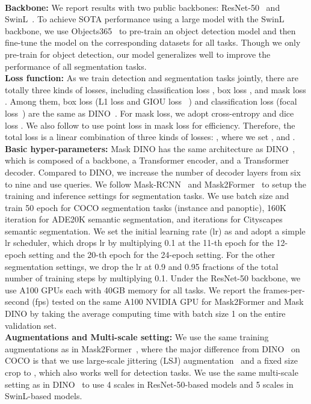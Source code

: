\documentclass[10pt,twocolumn,letterpaper]{article}
\begin{document}
\\\textbf{Backbone: }We report results with two public backbones: ResNet-50~\cite{he2015deep} and SwinL~\cite{liu2021swin}. To achieve SOTA performance using a large model with the SwinL backbone, we use Objects365~\cite{shao2019objects365} to pre-train an object detection model and then fine-tune the model on the corresponding datasets for all tasks. Though we only pre-train for object detection, our model generalizes well to improve the performance of all segmentation tasks.
\\\textbf{Loss function: }As we train detection and segmentation tasks jointly, there are totally three kinds of losses, including classification loss , box loss , and mask loss . Among them, box loss (L1 loss  and GIOU loss~\cite{rezatofighi2019generalized} ) and classification loss (focal loss~\cite{lin2018focal}) are the same as DINO~\cite{zhang2022dino}. For mask loss, we adopt cross-entropy  and dice loss . We also follow \cite{kirillov2020pointrend,cheng2021pointly,cheng2021mask2former} to use point loss in mask loss for efficiency. Therefore, the total loss is a linear combination of three kinds of losses: , where we set , and .
\\\textbf{Basic hyper-parameters: }Mask DINO has the same architecture as DINO~\cite{zhang2022dino}, which is composed of a backbone, a Transformer encoder, and a Transformer decoder. Compared to DINO, we increase the number of decoder layers from six to nine and use  queries. We follow Mask-RCNN~\cite{he2017mask} and Mask2Former~\cite{cheng2021mask2former} to setup the training and inference settings for segmentation tasks. We use batch size  and train 50 epoch for COCO segmentation tasks (instance and panoptic), 160K iteration for ADE20K semantic segmentation, and  iterations for Cityscapes semantic segmentation.
We set the initial learning rate (lr) as  and adopt a simple lr scheduler, which drops lr by multiplying 0.1 at the 11-th epoch for the 12-epoch setting and the 20-th epoch for the 24-epoch setting. For the other segmentation settings, we drop the lr at 0.9 and 0.95 fractions of the total number of training steps by multiplying 0.1. Under the ResNet-50 backbone, we use  A100 GPUs each with 40GB memory for all tasks. We report the frames-per-second (fps) tested on the same A100 NVIDIA GPU for Mask2Former and Mask DINO by taking the average computing time with batch size 1 on the entire validation set.
\\\textbf{Augmentations and Multi-scale setting: }We use the same training augmentations as in Mask2Former~\cite{cheng2021mask2former}, where the major difference from DINO~\cite{zhang2022dino} on COCO is that we use large-scale jittering (LSJ) augmentation~\cite{du2021simple,ghiasi2021simple} and a fixed size crop to , which also works well for detection tasks. We use the same multi-scale setting as in DINO~\cite{zhang2022dino} to use 4 scales in ResNet-50-based models and 5 scales in SwinL-based models.
\end{document}
